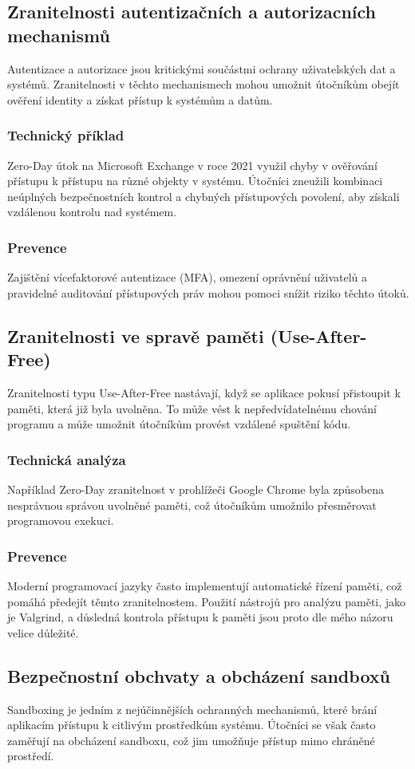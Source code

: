 \documentclass[11pt, conference, a4paper]{IEEEtran}
\begin{document}
\subsection{Zranitelnosti autentizačních a autorizacních mechanismů \cite{OWASP}}
Autentizace a autorizace jsou kritickými součástmi ochrany uživatelských dat a systémů. Zranitelnosti v těchto mechanismech mohou umožnit útočníkům obejít ověření identity a získat přístup k systémům a datům.

\subsubsection{Technický příklad} Zero-Day útok na Microsoft Exchange v roce 2021 využil chyby v ověřování přístupu k přístupu na různé objekty v systému. Útočníci zneužili kombinaci neúplných bezpečnostních kontrol a chybných přístupových povolení, aby získali vzdálenou kontrolu nad systémem.
\subsubsection{Prevence} Zajištění vícefaktorové autentizace (MFA), omezení oprávnění uživatelů a pravidelné auditování přístupových práv mohou pomoci snížit riziko těchto útoků.
\subsection{Zranitelnosti ve spravě paměti (Use-After-Free) \cite{mem}}
Zranitelnosti typu Use-After-Free nastávají, když se aplikace pokusí přistoupit k paměti, která již byla uvolněna. To může vést k nepředvídatelnému chování programu a m\r uže umožnit útočníkům provést vzdálené spuštění kódu.

\subsubsection{Technická analýza} Například Zero-Day zranitelnost v prohlížeči Google Chrome byla způsobena nesprávnou správou uvolněné paměti, což útočníkům umožnilo přesměrovat programovou exekuci.
\subsubsection{Prevence} Moderní programovací jazyky často implementují automatické řízení paměti, což pomáhá předejít těmto zranitelnostem. Použití nástrojů pro analýzu paměti, jako je Valgrind, a důsledná kontrola přístupu k paměti jsou proto dle mého názoru velice d\r uležité.
\subsection{Bezpečnostní obchvaty a obcházení sandboxů \cite{Cox}}
Sandboxing je jedním z nejúčinnějších ochranných mechanismů, které brání aplikacím přístupu k citlivým prostředkům systému. Útočníci se však často zaměřují na obcházení sandboxu, což jim umožňuje přístup mimo chráněné prostředí.
\end{document}
